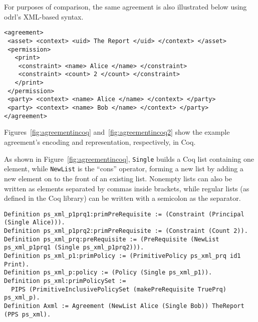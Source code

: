\documentclass[conference]{IEEEtran}
\newcommand{\syn}{\texttt}
\begin{document}
For purposes of comparison, the same agreement is also illustrated below using \ac{odrl}'s XML-based syntax.  

\lstset{language=Pucella2006, captionpos=b}
\begin{lstlisting}
<agreement>
 <asset> <context> <uid> The Report </uid> </context> </asset>
 <permission>
   <print>
    <constraint> <name> Alice </name> </constraint>
    <constraint> <count> 2 </count> </constraint>
   </print>
 </permission>
 <party> <context> <name> Alice </name> </context> </party>
 <party> <context> <name> Bob </name> </context> </party>
</agreement>
\end{lstlisting}


Figures~\ref{fig:agreementincoq} and~\ref{fig:agreementincoq2}
show the example agreement's encoding and representation, respectively, in Coq.

As shown in Figure~\ref{fig:agreementincoq}, \syn{Single} builds a Coq
list containing one element, while \syn{NewList} is the ``cons''
operator, forming a new list by adding a new element on to the front
of an existing list.  Nonempty lists can also be written as elements
separated by commas inside brackets, while regular lists (as defined in
the Coq library) can be written with a semicolon as the separator.

\lstset{language=Coq, captionpos=b}
\begin{figure*}
\begin{lstlisting}
Definition ps_xml_p1prq1:primPreRequisite := (Constraint (Principal (Single Alice))).
Definition ps_xml_p1prq2:primPreRequisite := (Constraint (Count 2)).
Definition ps_xml_prq:preRequisite := (PreRequisite (NewList ps_xml_p1prq1 (Single ps_xml_p1prq2))).
Definition ps_xml_p1:primPolicy := (PrimitivePolicy ps_xml_prq id1 Print).
Definition ps_xml_p:policy := (Policy (Single ps_xml_p1)).
Definition ps_xml:primPolicySet :=
  PIPS (PrimitiveInclusivePolicySet (makePreRequisite TruePrq) ps_xml_p).
Definition Axml := Agreement (NewList Alice (Single Bob)) TheReport (PPS ps_xml).
\end{lstlisting}
\caption{Coq Definitions for Example Agreement}
\label{fig:agreementincoq}
\end{figure*}
\end{document}

